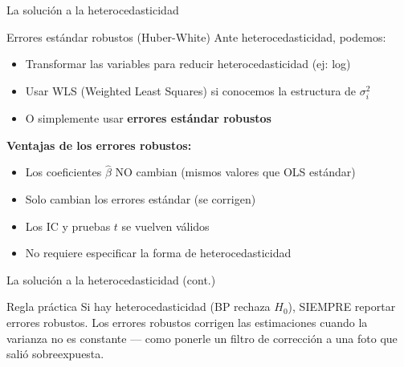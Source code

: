 \documentclass[aspectratio=169, 11pt]{beamer}
\begin{document}
\begin{frame}{La soluci\'on a la heterocedasticidad}
\begin{block}{Errores est\'andar robustos (Huber-White)}
Ante heterocedasticidad, podemos:
\begin{itemize}
\item Transformar las variables para reducir heterocedasticidad (ej: log)
\item Usar WLS (Weighted Least Squares) si conocemos la estructura de $\sigma_i^2$
\item O simplemente usar \textbf{errores est\'andar robustos}
\end{itemize}
\end{block}

\textbf{Ventajas de los errores robustos:}
\begin{itemize}
\item Los coeficientes $\hat{\beta}$ NO cambian (mismos valores que OLS est\'andar)
\item Solo cambian los errores est\'andar (se corrigen)
\item Los IC y pruebas $t$ se vuelven v\'alidos
\item No requiere especificar la forma de heterocedasticidad
\end{itemize}
\end{frame}

\begin{frame}{La soluci\'on a la heterocedasticidad (cont.)}
\begin{alertblock}{Regla pr\'actica}
Si hay heterocedasticidad (BP rechaza $H_0$), SIEMPRE reportar errores robustos. Los errores robustos corrigen las estimaciones cuando la varianza no es constante --- como ponerle un filtro de correcci\'on a una foto que sali\'o sobreexpuesta.
\end{alertblock}
\end{frame}
\end{document}
